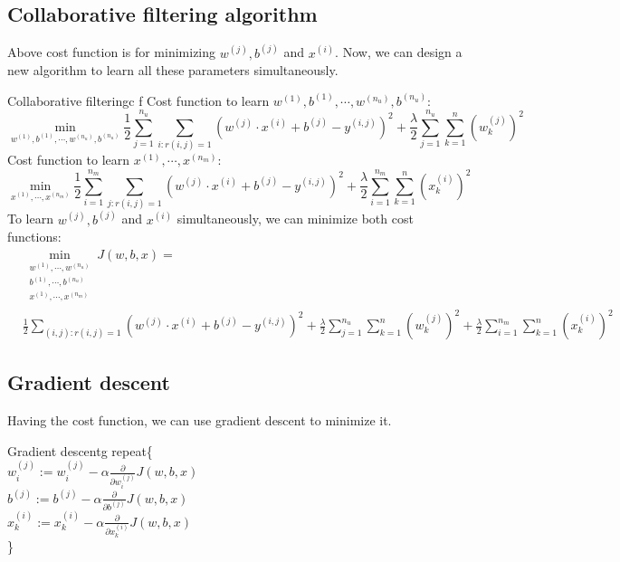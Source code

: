 \subsection*{Collaborative filtering algorithm}
Above cost function is for minimizing $w^{(j)}, b^{(j)}$ and $x^{(i)}$. Now, we can design a
new algorithm to learn all these parameters simultaneously.
\begin{thmbox}{Collaborative filtering}{c f}
    \hspace*{2em}Cost function to learn $w^{(1)}, b^{(1)}, \cdots, w^{(n_u)}, b^{(n_u)}$:
    \begin{equation*}
        \min \limits_{w^{(1)}, b^{(1)}, \cdots, w^{(n_u)}, b^{(n_u)}}
        \frac{1}{2} \sum_{j=1}^{n_u} \sum_{i:r(i,j)=1}
         \left(w^{(j)} \cdot x^{(i)} + b^{(j)} - y^{(i,j)} \right)^2 + 
         \frac{\lambda}{2} \sum_{j=1}^{n_u} \sum_{k=1}^{n} (w_k^{(j)})^2
    \end{equation*}
    \hspace*{2em}Cost function to learn $x^{(1)}, \cdots, x^{(n_m)}$:
    \begin{equation*}
        \min \limits_{x^{(1)}, \cdots, x^{(n_m)}}
        \frac{1}{2} \sum_{i=1}^{n_m} \sum_{j:r(i,j)=1}
         \left(w^{(j)} \cdot x^{(i)} + b^{(j)} - y^{(i,j)} \right)^2 + 
         \frac{\lambda}{2} \sum_{i=1}^{n_m} \sum_{k=1}^{n} (x_k^{(i)})^2
    \end{equation*}
    \hspace*{2em}To learn $w^{(j)}, b^{(j)}$ and $x^{(i)}$ simultaneously, we can minimize both cost functions:
    \begin{align}
        &\min \limits_{\substack{w^{(1)}, \cdots, w^{(n_u)} \\ b^{(1)}, \cdots, b^{(n_u)} \\ x^{(1)}, \cdots, x^{(n_m)}}}
        J(w, b, x) = \\ \nonumber
        &\frac{1}{2} \sum_{(i,j):r(i,j)=1}
         \left(w^{(j)} \cdot x^{(i)} + b^{(j)} - y^{(i,j)} \right)^2 + 
         \frac{\lambda}{2} \sum_{j=1}^{n_u} \sum_{k=1}^{n} (w_k^{(j)})^2 + 
         \frac{\lambda}{2} \sum_{i=1}^{n_m} \sum_{k=1}^{n} (x_k^{(i)})^2
    \end{align}
\end{thmbox}

\subsection*{Gradient descent}
Having the cost function, we can use gradient descent to minimize it.
\begin{thmbox}{Gradient descent}{g}
repeat\{\\
    \hspace*{2em}$w_i^{(j)} := w_i^{(j)} - \alpha \frac{\partial}{\partial w_i^{(j)}}J(w, b, x)$\\
    \hspace*{2em}$b^{(j)} := b^{(j)} - \alpha \frac{\partial}{\partial b^{(j)}}J(w, b, x)$\\
    \hspace*{2em}$x_k^{(i)} := x_k^{(i)} - \alpha \frac{\partial}{\partial x_k^{(i)}}J(w, b, x)$\\
\}
\end{thmbox}

